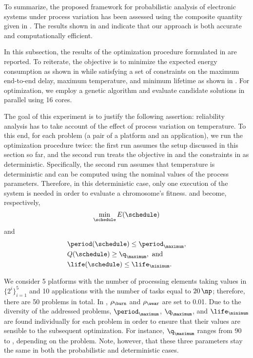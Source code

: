 To summarize, the proposed framework for probabilistic analysis of electronic
systems under process variation has been assessed using the composite quantity
given in . The results shown in
 and  indicate
that our approach is both accurate and computationally efficient.


In this subsection, the results of the optimization procedure formulated in
 are reported. To reiterate, the objective is to
minimize the expected energy consumption as shown in
 while satisfying a set of constraints on the
maximum end-to-end delay, maximum temperature, and minimum lifetime as shown in
. For optimization, we employ a genetic
algorithm and evaluate candidate solutions in parallel using 16 cores.

The goal of this experiment is to justify the following assertion: reliability
analysis has to take account of the effect of process variation on temperature.
To this end, for each problem (a pair of a platform and an application), we run
the optimization procedure twice: the first run assumes the setup discussed in
this section so far, and the second run treats the objective in
 and the constraints in
 as deterministic. Specifically, the second
run assumes that temperature is deterministic and can be computed using the
nominal values of the process parameters. Therefore, in this deterministic case,
only one execution of the system is needed in order to evaluate a chromosome's
fitness.  and
 become, respectively,
\[
    \min_{\schedule} E(\schedule)
\]
and
\begin{align*}
  & \period(\schedule) \leq \period_\maximum, \\
  & Q(\schedule) \geq \q_\maximum, \text{ and} \\
  & \life(\schedule) \leq \life_\minimum.
\end{align*}

We consider 5 platforms with the number of processing elements \np taking values
in $\{ 2^i \}_{i = 1}^5$ and 10 applications with the number of tasks \nt equal
to $20 \, \np$; therefore, there are 50 problems in total. In
, $\rho_\burn$ and $\rho_\wear$ are set to
0.01. Due to the diversity of the addressed problems, $\period_\maximum$,
$\q_\maximum$, and $\life_\minimum$ are found individually for each problem in
order to ensure that their values are sensible to the subsequent optimization.
For instance, $\q_\maximum$ ranges from 90 to , depending on the
problem. Note, however, that these three parameters stay the same in both the
probabilistic and deterministic cases.

